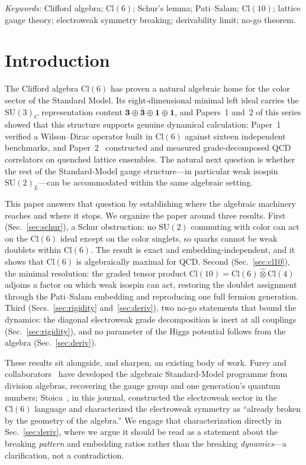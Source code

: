 \documentclass[12pt]{article}
\theoremstyle{remark}
\newcommand{\cl}{\mathrm{Cl}}
\newcommand{\su}{\mathrm{SU}}
\newcommand{\grtensor}{\mathbin{\widehat{\otimes}}}  %
\begin{document}
\bigskip
\noindent\textit{Keywords:} Clifford algebra; $\cl(6)$; Schur's lemma;
Pati--Salam; $\cl(10)$; lattice gauge theory; electroweak symmetry breaking;
derivability limit; no-go theorem.

\section{Introduction}
\label{sec:intro}

The Clifford algebra $\cl(6)$ has proven a natural algebraic home for the color
sector of the Standard Model.  Its eight-dimensional minimal left ideal carries
the $\su(3)_C$ representation content
$\mathbf{3}\oplus\bar{\mathbf{3}}\oplus\mathbf{1}\oplus\mathbf{1}$, and Papers~1
and~2 of this series showed that this structure supports genuine dynamical
calculation: Paper~1~\cite{FirestoneP1} verified a Wilson--Dirac operator built
in $\cl(6)$ against sixteen independent benchmarks, and
Paper~2~\cite{FirestoneP2} constructed and measured grade-decomposed QCD
correlators on quenched lattice ensembles.  The natural next question is whether
the rest of the Standard-Model gauge structure---in particular weak isospin
$\su(2)_L$---can be accommodated within the same algebraic setting.

This paper answers that question by establishing where the algebraic machinery
reaches and where it stops.  We organize the paper around three results.  First
(Sec.~\ref{sec:schur}), a Schur obstruction: no $\su(2)$ commuting with color
can act on the $\cl(6)$ ideal except on the color singlets, so quarks cannot be
weak doublets within $\cl(6)$.  The result is exact and embedding-independent,
and it shows that $\cl(6)$ is algebraically maximal for QCD.  Second
(Sec.~\ref{sec:cl10}), the minimal resolution: the graded tensor product
$\cl(10)=\cl(6)\grtensor\cl(4)$ adjoins a factor on which weak isospin can act,
restoring the doublet assignment through the Pati--Salam embedding and
reproducing one full fermion generation.  Third (Secs.~\ref{sec:rigidity}
and~\ref{sec:deriv}), two no-go statements that bound the dynamics: the diagonal
electroweak grade decomposition is inert at all couplings
(Sec.~\ref{sec:rigidity}), and no parameter of the Higgs potential follows from
the algebra (Sec.~\ref{sec:deriv}).

These results sit alongside, and sharpen, an existing body of work.  Furey and
collaborators~\cite{Furey2012,Furey2014,Furey2015,Furey2018a,Furey2018b} have
developed the algebraic Standard-Model programme from division algebras,
recovering the gauge group and one generation's quantum numbers;
Stoica~\cite{Stoica2018}, in this journal, constructed the electroweak sector in
the $\cl(6)$ language and characterized the electroweak symmetry as ``already
broken by the geometry of the algebra.''  We engage that characterization
directly in Sec.~\ref{sec:deriv}, where we argue it should be read as a
statement about the breaking \emph{pattern} and embedding ratios rather than the
breaking \emph{dynamics}---a clarification, not a contradiction.
\end{document}
